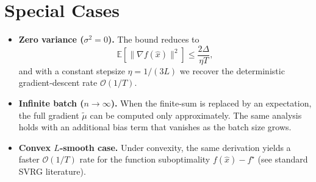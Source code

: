 \documentclass{article}
\newcommand{\E}{\mathbb{E}}
\begin{document}
\section*{Special Cases}
\begin{itemize}
\item \textbf{Zero variance ($\sigma^{2}=0$).} The bound reduces to
\[
\E[\|\nabla f(\hat{x})\|^{2}]\le \frac{2\Delta}{\eta T},
\]
and with a constant stepsize $\eta=1/(3L)$ we recover the deterministic gradient‑descent rate $\mathcal{O}(1/T)$.
\item \textbf{Infinite batch ($n\to\infty$).} When the finite‑sum is replaced by an expectation, the full gradient $\tilde{\mu}$ can be computed only approximately. The same analysis holds with an additional bias term that vanishes as the batch size grows.
\item \textbf{Convex $L$‑smooth case.} Under convexity, the same derivation yields a faster $\mathcal{O}(1/T)$ rate for the function suboptimality $f(\hat{x})-f^{\star}$ (see standard SVRG literature).
\end{itemize}
\end{document}
